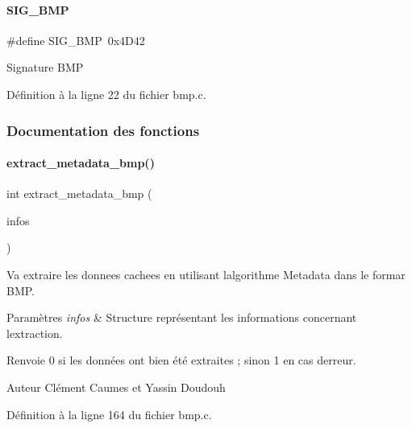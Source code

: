 \paragraph{\texorpdfstring{S\+I\+G\+\_\+\+B\+MP}{SIG\_BMP}}
{\footnotesize\ttfamily \#define S\+I\+G\+\_\+\+B\+MP~0x4\+D42}

Signature B\+MP 

Définition à la ligne 22 du fichier bmp.\+c.



\subsubsection{Documentation des fonctions}
\mbox{\label{a00074_a14e9a0ddec04cc168cbfe21cd839166e}} 
\paragraph{\texorpdfstring{extract\+\_\+metadata\+\_\+bmp()}{extract\_metadata\_bmp()}}
{\footnotesize\ttfamily int extract\+\_\+metadata\+\_\+bmp (\begin{DoxyParamCaption}\item[{\hyperlink{a00008_aa8ca908d92fb5bdd3c0a9e1f58b2cf03}{info\+\_\+s} $\ast$}]{infos }\end{DoxyParamCaption})}



Va extraire les donnees cachees en utilisant l\textquotesingle{}algorithme Metadata dans le formar B\+MP. 


\begin{DoxyParams}{Paramètres}
{\em infos} & Structure représentant les informations concernant l\textquotesingle{}extraction. \\
\hline
\end{DoxyParams}
\begin{DoxyReturn}{Renvoie}
0 si les données ont bien été extraites ; sinon 1 en cas d\textquotesingle{}erreur. 
\end{DoxyReturn}
\begin{DoxyAuthor}{Auteur}
Clément Caumes et Yassin Doudouh 
\end{DoxyAuthor}


Définition à la ligne 164 du fichier bmp.\+c.

